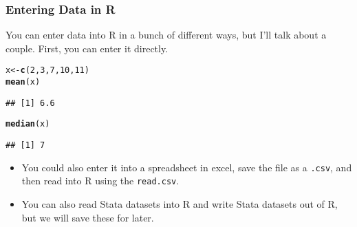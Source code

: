 \documentclass[11pt,containsverbatim,handout]{beamer}
\makeatletter
\newcommand{\hlnum}[1]{\textcolor[rgb]{0.686,0.059,0.569}{#1}}%
\newcommand{\hlstd}[1]{\textcolor[rgb]{0.345,0.345,0.345}{#1}}%
\newcommand{\hlkwb}[1]{\textcolor[rgb]{0.69,0.353,0.396}{#1}}%
\newcommand{\hlkwd}[1]{\textcolor[rgb]{0.737,0.353,0.396}{\textbf{#1}}}%
\newenvironment{kframe}{%
 \def\at@end@of@kframe{}%
 \ifinner\ifhmode%
  \def\at@end@of@kframe{\end{minipage}}%
  \begin{minipage}{\columnwidth}%
 \fi\fi%
 \def\FrameCommand##1{\hskip\@totalleftmargin \hskip-\fboxsep
 \colorbox{shadecolor}{##1}\hskip-\fboxsep
     \hskip-\linewidth \hskip-\@totalleftmargin \hskip\columnwidth}%
 \MakeFramed {\advance\hsize-\width
   \@totalleftmargin\z@ \linewidth\hsize
   \@setminipage}}%
 {\par\unskip\endMakeFramed%
 \at@end@of@kframe}
\newenvironment{knitrout}{}{} %
\makeatother
\begin{document}
\begin{frame}[fragile]

\frametitle{Entering Data in R}

You can enter data into R in a bunch of different ways, but I'll talk about a couple.  First, you can enter it directly. 

\begin{footnotesize}
\begin{knitrout}
\color{fgcolor}\begin{kframe}
\begin{alltt}
\hlstd{x} \hlkwb{<-} \hlkwd{c}\hlstd{(}\hlnum{2}\hlstd{,}\hlnum{3}\hlstd{,}\hlnum{7}\hlstd{,}\hlnum{10}\hlstd{,}\hlnum{11}\hlstd{)}
\hlkwd{mean}\hlstd{(x)}
\end{alltt}
\begin{verbatim}
## [1] 6.6
\end{verbatim}
\begin{alltt}
\hlkwd{median}\hlstd{(x)}
\end{alltt}
\begin{verbatim}
## [1] 7
\end{verbatim}
\end{kframe}
\end{knitrout}
\end{footnotesize}
\begin{itemize}

\item You could also enter it into a spreadsheet in excel, save the file as a \verb".csv", and then read into R using the \verb"read.csv". 

\item You can also read Stata datasets into R and write Stata datasets out of R, but we will save these for later. 

\end{itemize}

\end{frame}
\end{document}

